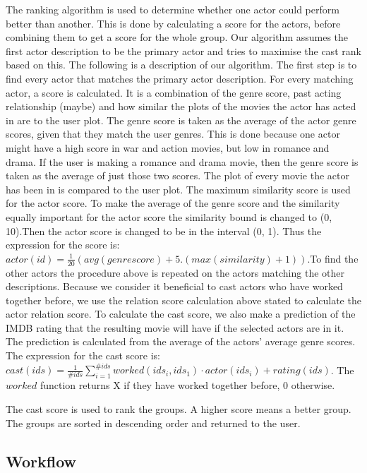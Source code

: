 The ranking algorithm is used to determine whether one actor could perform better than another. This is done by calculating a score for the actors, before combining them to get a score for the whole group. Our algorithm assumes the first actor description to be the primary actor and tries to maximise the cast rank based on this. The following is a description of our algorithm. The first step is to find every actor that matches the primary actor description. For every matching actor, a score is calculated. It is a combination of the genre score, past acting relationship (maybe) and how similar the plots of the movies the actor has acted in are to the user plot. The genre score is taken as the average of the actor genre scores, given that they match the user genres. This is done because one actor might have a high score in war and action movies, but low in romance and drama. If the user is making a romance and drama movie, then the genre score is taken as the average of just those two scores. The plot of every movie the actor has been in is compared to the user plot. The maximum similarity score is used for the actor score. To make the average of the genre score and the similarity equally important for the actor score the similarity bound is changed to (0, 10).Then the actor score is changed to be in the interval (0, 1). Thus the expression for the score is: $actor(id)=\frac{1}{20}(avg(genrescore)+5.(max(similarity)+1))$.To find the other actors the procedure above is repeated on the actors matching the other descriptions. Because we consider it beneficial to cast actors who have worked together before, we use the relation score calculation above stated to calculate the actor relation score. To calculate the cast score, we also make a prediction of the IMDB rating that the resulting movie will have if the selected actors are in it. The prediction is calculated from the average of the actors’ average genre scores. The expression for the cast score is: $cast(ids)=\frac{1}{\#ids}\sum_{i=1}^{\#ids}worked(ids_i, ids_1)\cdot actor(ids_i) + rating(ids)$. The $worked$ function returns X if they have worked together before, 0 otherwise. 

The cast score is used to rank the groups. A higher score means a better group. The groups are sorted in descending order and returned to the user.

\subsection{Workflow}

